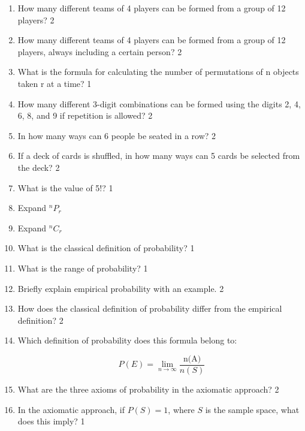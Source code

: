 \documentclass[a4paper,oneside, margin=1.4in]{book}
\begin{document}
\begin{enumerate}
\item How many different teams of 4 players can be formed from a group of 12 players? \hfill 2

\item How many different teams of 4 players can be formed from a group of 12 players, always including a certain person? \hfill 2

\item What is the formula for calculating the number of permutations of n objects taken r at a time? \hfill 1

\item How many different 3-digit combinations can be formed using the digits 2, 4, 6, 8, and 9 if repetition is allowed? \hfill 2

\item In how many ways can 6 people be seated in a row? \hfill 2

\item If a deck of cards is shuffled, in how many ways can 5 cards be selected from the deck? \hfill 2

\item What is the value of 5!? \hfill 1

\item Expand ${}^nP_r$

\item Expand ${}^nC_r$

\item What is the classical definition of probability? \hfill 1

\item What is the range of probability? \hfill 1

\item Briefly explain empirical probability with an example. \hfill 2

\item How does the classical definition of probability differ from the empirical definition? \hfill 2

\item Which definition of probability does this formula belong to: 

\[
P(E) = \lim_{n \to \infty} \frac{\text{n(A)}}{n(S)}
\]

\item What are the three axioms of probability in the axiomatic approach? \hfill 2

\item In the axiomatic approach, if \( P(S) = 1 \), where \( S \) is the sample space, what does this imply? \hfill 1


\end{enumerate}
\end{document}
